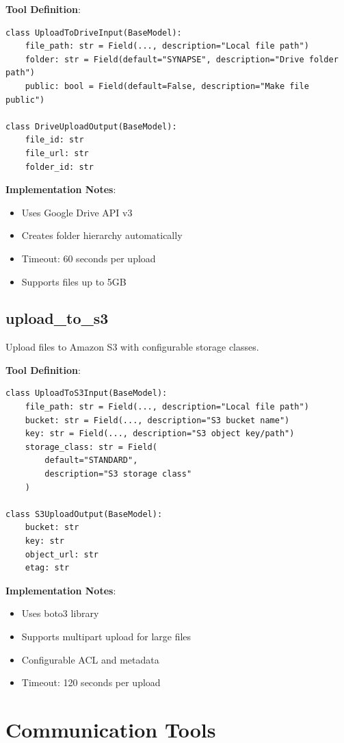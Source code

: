 \documentclass{report}
\begin{document}
\textbf{Tool Definition}:
\begin{lstlisting}
class UploadToDriveInput(BaseModel):
    file_path: str = Field(..., description="Local file path")
    folder: str = Field(default="SYNAPSE", description="Drive folder path")
    public: bool = Field(default=False, description="Make file public")

class DriveUploadOutput(BaseModel):
    file_id: str
    file_url: str
    folder_id: str
\end{lstlisting}

\textbf{Implementation Notes}:
\begin{itemize}
    \item Uses Google Drive API v3
    \item Creates folder hierarchy automatically
    \item Timeout: 60 seconds per upload
    \item Supports files up to 5GB
\end{itemize}

\subsection{upload\_to\_s3}

Upload files to Amazon S3 with configurable storage classes.

\textbf{Tool Definition}:
\begin{lstlisting}
class UploadToS3Input(BaseModel):
    file_path: str = Field(..., description="Local file path")
    bucket: str = Field(..., description="S3 bucket name")
    key: str = Field(..., description="S3 object key/path")
    storage_class: str = Field(
        default="STANDARD",
        description="S3 storage class"
    )

class S3UploadOutput(BaseModel):
    bucket: str
    key: str
    object_url: str
    etag: str
\end{lstlisting}

\textbf{Implementation Notes}:
\begin{itemize}
    \item Uses boto3 library
    \item Supports multipart upload for large files
    \item Configurable ACL and metadata
    \item Timeout: 120 seconds per upload
\end{itemize}

\section{Communication Tools}
\end{document}
